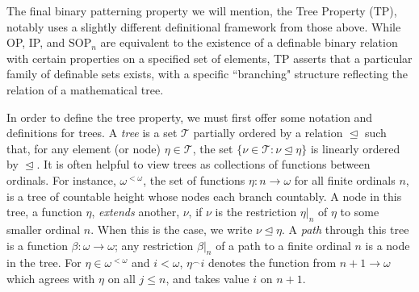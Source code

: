\documentclass{article}
\newcommand{\calT}{\mathcal{T}}
\theoremstyle{definition}
\theoremstyle{definition}
\theoremstyle{definition}
\begin{document}
The final binary patterning property we will mention, the Tree Property (TP), notably uses a slightly different definitional framework from those above. While OP, IP, and $\mathrm{SOP}_n$ are equivalent to the existence of a definable binary relation with certain properties on a specified set of elements, TP asserts that a particular family of definable sets exists, with a specific ``branching" structure reflecting the relation of a mathematical tree.

In order to define the tree property, we must first offer some notation and definitions for trees. A \textit{tree} is a set $\calT$ partially ordered by a relation $\trianglelefteq$ such that, for any element (or node) $\eta\in \calT$, the set $\{\nu\in \calT\colon \nu\trianglelefteq\eta\}$ is linearly ordered by $\trianglelefteq$. It is often helpful to view trees as collections of functions between ordinals. For instance, $\omega^{<\omega}$, the set of functions $\eta\colon n\to\omega$ for all finite ordinals $n$, is a tree of countable height whose nodes each branch countably. A node in this tree, a function $\eta$, \textit{extends} another, $\nu$, if $\nu$ is the restriction $\eta|_n$ of $\eta$ to some smaller ordinal $n$. When this is the case, we write $\nu\trianglelefteq\eta$. A \textit{path} through this tree is a function $\beta\colon \omega\to\omega$; any restriction $\beta|_n$ of a path to a finite ordinal $n$ is a node in the tree. For $\eta\in \omega^{<\omega}$ and $i<\omega$, $\eta^\smallfrown i$ denotes the function from $n+1\to \omega$ which agrees with $\eta$ on all $j\leq n$, and takes value $i$ on $n+1$.
\end{document}
